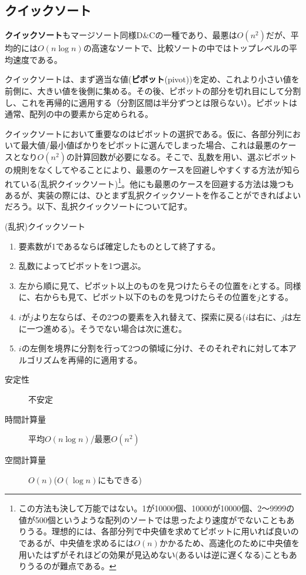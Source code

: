 \subsection{クイックソート}
\textbf{クイックソート}もマージソート同様D\&Cの一種であり、最悪は$O(n^2)$だが、平均的には$O(n\log n)$の高速なソートで、比較ソートの中ではトップレベルの平均速度である。

クイックソートは、まず適当な値(\textbf{ピボット}(pivot))を定め、これより小さい値を前側に、大きい値を後側に集める。その後、ピボットの部分を切れ目にして分割し、これを再帰的に適用する（分割区間は半分ずつとは限らない）。ピボットは通常、配列の中の要素から定められる。

クイックソートにおいて重要なのはピボットの選択である。仮に、各部分列において最大値/最小値ばかりをピボットに選んでしまった場合、これは最悪のケースとなり$O(n^2)$の計算回数が必要になる。そこで、乱数を用い、選ぶピボットの規則をなくしてやることにより、最悪のケースを回避しやすくする方法が知られている(乱択クイックソート)\footnote{この方法も決して万能ではない。1が10000個、10000が10000個、2〜9999の値が500個というような配列のソートでは思ったより速度がでないこともありうる。理想的には、各部分列で中央値を求めてピボットに用いれば良いのであるが、中央値を求めるには$O(n)$かかるため、高速化のために中央値を用いたはずがそれほどの効果が見込めない(あるいは逆に遅くなる)こともありうるのが難点である。}。他にも最悪のケースを回避する方法は幾つもあるが、実装の際には、ひとまず乱択クイックソートを作ることができればよいだろう。以下、乱択クイックソートについて記す。
\begin{itembox}[l]{(乱択)クイックソート}
\begin{enumerate}
\item 要素数が1であるならば確定したものとして終了する。
\item 乱数によってピボットを1つ選ぶ。
\item 左から順に見て、ピボット以上のものを見つけたらその位置を$i$とする。同様に、右からも見て、ピボット以下のものを見つけたらその位置を$j$とする。
\item $i$が$j$より左ならば、その2つの要素を入れ替えて、探索に戻る($i$は右に、$j$は左に一つ進める)。そうでない場合は次に進む。
\item $i$の左側を境界に分割を行って2つの領域に分け、そのそれぞれに対して本アルゴリズムを再帰的に適用する。
\end{enumerate}
\begin{multicols}{2}
\begin{description}
\item[安定性] 不安定
\item[時間計算量] 平均$O(n \log n)$/最悪$O(n^2)$
\item[空間計算量] $O(n)$($O(\log n)$にもできる)
\end{description}
\end{multicols}
\end{itembox}

